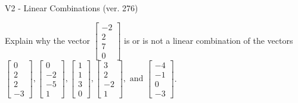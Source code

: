 \begin{exercise}
  \begin{exerciseTitle}V2 - Linear Combinations (ver. 276)\end{exerciseTitle}
  \begin{exerciseStatement}
    Explain why the vector \(\left[\begin{array}{c}
-2 \\
2 \\
7 \\
0
\end{array}\right]\)  is or is not a linear 
	combination of the vectors \(\left[\begin{array}{c}
0 \\
2 \\
2 \\
-3
\end{array}\right] , \left[\begin{array}{c}
0 \\
-2 \\
-5 \\
1
\end{array}\right] , \left[\begin{array}{c}
1 \\
1 \\
3 \\
0
\end{array}\right] , \left[\begin{array}{c}
3 \\
2 \\
-2 \\
1
\end{array}\right] , \text{ and } \left[\begin{array}{c}
-4 \\
-1 \\
0 \\
-3
\end{array}\right]\).
	



\end{exerciseStatement}
\end{exercise}
